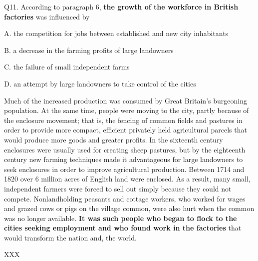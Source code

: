 \begin{blk}
    \begin{qst}
        Q11. According to paragraph 6, \textbf{the growth of the workforce in British factories} was influenced by
    \end{qst}

    \begin{chc}
        A. the competition for jobs between established and new city inhabitants

        B. a decrease in the farming profits of large landowners

        C. the failure of small independent farms

        D. an attempt by large landowners to take control of the cities
    \end{chc}

    \begin{psgq}
        Much of the increased production was consumed by Great Britain’s burgeoning population. At the same time, people were moving to the city, partly because of the enclosure movement; that is, the fencing of common fields and pastures in order to provide more compact, efficient privately held agricultural parcels that would produce more goods and greater profits. In the sixteenth century enclosures were usually used for creating sheep pastures, but by the eighteenth century new farming techniques made it advantageous for large landowners to seek enclosures in order to improve agricultural production. Between 1714 and 1820 over 6 million acres of English land were enclosed. As a result, many small, independent farmers were forced to sell out simply because they could not compete. Nonlandholding peasants and cottage workers, who worked for wages and grazed cows or pigs on the village common, were also hurt when the common was no longer available. \textbf{It was such people who began to flock to the cities seeking employment and who found work in the factories} that would transform the nation and, the world.
    \end{psgq}

    \begin{nlz}
        XXX
    \end{nlz}
\end{blk}


